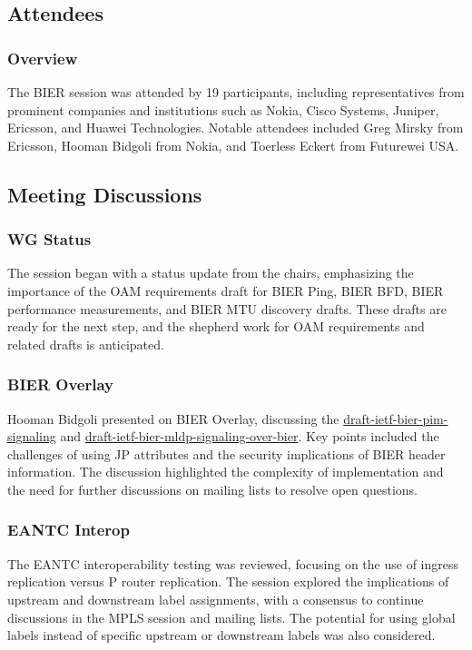 \documentclass{article}
\begin{document}
\subsection{Attendees}
\subsubsection{Overview}
The BIER session was attended by 19 participants, including representatives from prominent companies and institutions such as Nokia, Cisco Systems, Juniper, Ericsson, and Huawei Technologies. Notable attendees included Greg Mirsky from Ericsson, Hooman Bidgoli from Nokia, and Toerless Eckert from Futurewei USA.

\subsection{Meeting Discussions}

\subsubsection{WG Status}
The session began with a status update from the chairs, emphasizing the importance of the OAM requirements draft for BIER Ping, BIER BFD, BIER performance measurements, and BIER MTU discovery drafts. These drafts are ready for the next step, and the shepherd work for OAM requirements and related drafts is anticipated.

\subsubsection{BIER Overlay}
Hooman Bidgoli presented on BIER Overlay, discussing the \href{https://datatracker.ietf.org/doc/html/draft-ietf-bier-pim-signaling}{draft-ietf-bier-pim-signaling} and \href{https://datatracker.ietf.org/doc/html/draft-ietf-bier-mldp-signaling-over-bier}{draft-ietf-bier-mldp-signaling-over-bier}. Key points included the challenges of using JP attributes and the security implications of BIER header information. The discussion highlighted the complexity of implementation and the need for further discussions on mailing lists to resolve open questions.

\subsubsection{EANTC Interop}
The EANTC interoperability testing was reviewed, focusing on the use of ingress replication versus P router replication. The session explored the implications of upstream and downstream label assignments, with a consensus to continue discussions in the MPLS session and mailing lists. The potential for using global labels instead of specific upstream or downstream labels was also considered.
\end{document}
